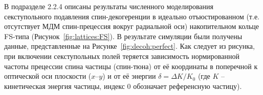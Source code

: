 В подразделе 2.2.4 описаны результаты численного моделирования секступольного подавления спин-декогеренции 
в идеально отъюстированном (т.е. отсутствует МДМ спин-прецессия вокруг радиальной оси) накопительном кольце 
FS-типа (Рисунок~\ref{fig:lattices:FS}). В результате симуляции были получены данные, представленные на Рисунке~\ref{fig:decoh:perfect}. Как следует из рисунка, при включении секступольных полей теряется зависимость
нормированной частоты прецессии спина частицы (спин-тюна) от её координаты в поперечной к оптической оси
 плоскости ($x$--$y$) и от её энергии $\delta = \Delta K/K_0$ 
 (где $K$ -- кинетическая энергия частицы, индекс 0 обозначает референсную частицу).

\begin{figure}[H]
	\centering
\end{figure}
